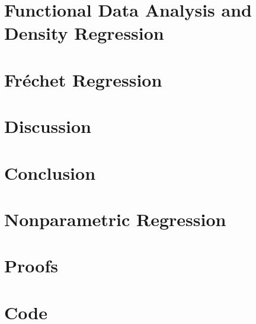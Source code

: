 \documentclass[12pt, a4paper, bibtotoc, liststotoc]{scrartcl}
\begin{document}
\section{Functional Data Analysis and Density Regression}
\label{sec:fda}


\section{Fréchet Regression}
\label{sec:fréchet regression}


\section{Discussion}
\label{sec:discussion}

\section{Conclusion}
\label{sec:conclusion}





\newpage
\appendix
{}

\section{Nonparametric Regression}
\label{sec:npregression}

\section{Proofs}
\label{sec:proofs}

\section{Code}
\label{sec:code}



\newpage

\nocite{von_gaudecker_templates_2019}
\printbibliography
\end{document}
